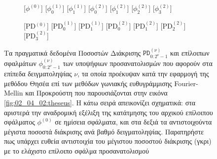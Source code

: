 \begin{figure}[!h]
  \begin{subfigure}{0.5\linewidth}
    \begin{onion}{1.0cm}
      [$\phi^{(0)}$]
      [$\phi_0^{(1)}$]
      [$\phi_1^{(1)}$]
      [$\phi_0^{(2)}$]
      [$\phi_1^{(2)}$]
      [$\phi_2^{(2)}$]
      [$\phi_3^{(2)}$]
    \end{onion}
  \end{subfigure}%
  \begin{subfigure}{0.5\linewidth}\vspace{-0.1cm}
    \begin{onion}{1.0cm}
      [PD$^{(0)}$]
      [PD$_0^{(1)}$]
      [PD$_1^{(1)}$]
      [PD$_0^{(2)}$]
      [PD$_1^{(2)}$]
      [PD$_2^{(2)}$]
      [PD$_3^{(2)}$]
    \end{onion}
  \end{subfigure}
\vspace{-1cm}
\caption{\small Τα πραγματικά δεδομένα Ποσοστών Διάκρισης
         $\texttt{PD}^{(\nu)}_{0:2^{\nu}-1}$ και επίλοιπων σφαλμάτων
         $\phi^{(\nu)}_{0:2^{\nu}-1}$ των υποψήφιων προσανατολισμών που αφορούν
         στα επίπεδα δειγματοληψίας $\nu$, τα οποία προέκυψαν κατά την εφαρμογή
         της μεθόδου Θησέα επί των μεθόδων γωνιακής ευθυγράμμισης
         Fourier-Mellin και Προκρούστη που παρουσιάζονται στην εικόνα
         \ref{fig:02_04_02:theseus}. Η κάτω σειρά απεικονίζει σχηματικά: στα
         αριστερά την αναδρομική εξέλιξη της κατάτμησης του αρχικού επίλοιπου
         σφάλματος $\phi^{(0)}$ σε ημίσεια σφάλματα, και στα δεξιά τα
         αντιστοιχούντα μέγιστα ποσοστά διάκρισης ανά βαθμό δειγματοληψίας.
         Παρατηρήστε πως υπάρχει ευθεία αντιστοιχία του μέγιστου ποσοστού
         διάκρισης (γκρι) με το ελάχιστο επίλοιπο σφάλμα προσανατολισμού}
\label{fig:02_04_02:theseus_pd}
\end{figure}

